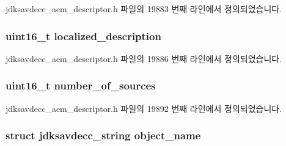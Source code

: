 jdksavdecc\+\_\+aem\+\_\+descriptor.\+h 파일의 19883 번째 라인에서 정의되었습니다.

\subsubsection[{\texorpdfstring{localized\+\_\+description}{localized_description}}]{\setlength{\rightskip}{0pt plus 5cm}uint16\+\_\+t localized\+\_\+description}\hypertarget{structjdksavdecc__descriptor__mixer_a0926f846ca65a83ad5bb06b4aff8f408}{}\label{structjdksavdecc__descriptor__mixer_a0926f846ca65a83ad5bb06b4aff8f408}


jdksavdecc\+\_\+aem\+\_\+descriptor.\+h 파일의 19886 번째 라인에서 정의되었습니다.

\subsubsection[{\texorpdfstring{number\+\_\+of\+\_\+sources}{number_of_sources}}]{\setlength{\rightskip}{0pt plus 5cm}uint16\+\_\+t number\+\_\+of\+\_\+sources}\hypertarget{structjdksavdecc__descriptor__mixer_a1af3a7f3729937d5da218737ba5b2483}{}\label{structjdksavdecc__descriptor__mixer_a1af3a7f3729937d5da218737ba5b2483}


jdksavdecc\+\_\+aem\+\_\+descriptor.\+h 파일의 19892 번째 라인에서 정의되었습니다.

\subsubsection[{\texorpdfstring{object\+\_\+name}{object_name}}]{\setlength{\rightskip}{0pt plus 5cm}struct {\bf jdksavdecc\+\_\+string} object\+\_\+name}\hypertarget{structjdksavdecc__descriptor__mixer_a7d1f5945a13863b1762fc6db74fa8f80}{}\label{structjdksavdecc__descriptor__mixer_a7d1f5945a13863b1762fc6db74fa8f80}


